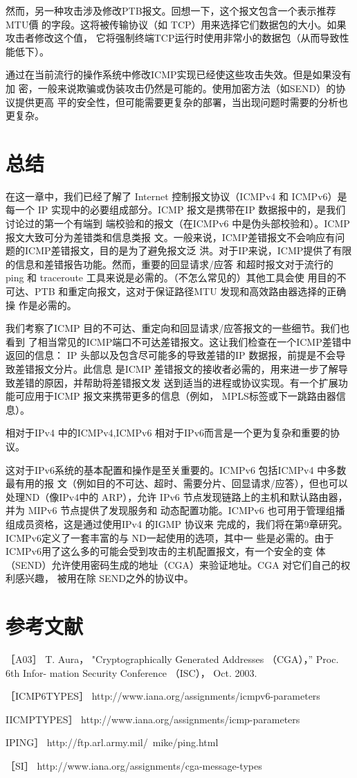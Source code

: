 然而，另一种攻击涉及修改PTB报文。回想一下，这个报文包含一个表示推荐MTU價
的字段。这将被传输协议（如 TCP）用来选择它们数据包的大小。如果攻击者修改这个值，
它将强制终端TCP运行时使用非常小的数据包（从而导致性能低下）。

通过在当前流行的操作系统中修改ICMP实现已经使这些攻击失效。但是如果没有加
密，一般来说欺骗或伪装攻击仍然是可能的。使用加密方法（如SEND）的协议提供更高
平的安全性，但可能需要更复杂的部署，当出现问题时需要的分析也更复杂。

\section{总结}

在这一章中，我们已经了解了 Internet 控制报文协议（ICMPv4 和 ICMPv6）是每一个 IP
实现中的必要组成部分。ICMP 报文是携带在IP 数据报中的，是我们讨论过的第一个有端到
端校验和的报文（在ICMPv6 中是伪头部校验和）。ICMP报文大致可分为差错类和信息类报
文。一般来说，ICMP差错报文不会响应有问题的ICMP差错报文，目的是为了避免报文泛
洪。对于IP来说，ICMP提供了有限的信息和差错报告功能。然而，重要的回显请求/应答
和超时报文对于流行的 ping 和 traceroute 工具来说是必需的。（不怎么常见的）其他工具会使
用目的不可达、PTB 和重定向报文，这对于保证路径MTU 发现和高效路由器选择的正确操
作是必需的。

我们考察了ICMP 目的不可达、重定向和回显请求/应答报文的一些细节。我们也看到
了相当常见的ICMP端口不可达差错报文。这让我们检查在一个ICMP差错中返回的信息：
IP 头部以及包含尽可能多的导致差错的IP 数据报，前提是不会导致差错报文分片。此信息
是ICMP 差错报文的接收者必需的，用来进一步了解导致差错的原因，并帮助将差错报文发
送到适当的进程或协议实现。有一个扩展功能可应用于ICMP 报文来携带更多的信息（例如，
MPLS标签或下一跳路由器信息）。

相对于IPv4 中的ICMPv4,ICMPv6 相对于IPv6而言是一个更为复杂和重要的协议。

这对于IPv6系统的基本配置和操作是至关重要的。ICMPv6 包括ICMPv4 中多数最有用的报
文（例如目的不可达、超时、需要分片、回显请求/应答），但也可以处理ND（像IPv4中的
ARP），允许 IPv6 节点发现链路上的主机和默认路由器，并为 MIPv6 节点提供了发现服务和
动态配置功能。ICMPv6 也可用于管理组播组成员资格，这是通过使用IPv4 的IGMP 协议来
完成的，我们将在第9章研究。ICMPv6定义了一套丰富的与 ND一起使用的选项，其中一
些是必需的。由于ICMPv6用了这么多的可能会受到攻击的主机配置报文，有一个安全的变
体（SEND）允许使用密码生成的地址（CGA）来验证地址。CGA 对它们自己的权利感兴趣，
被用在除 SEND之外的协议中。

\section{参考文献}
［A03］ T. Aura， "Cryptographically Generated Addresses （CGA），” Proc. 6th Infor-
mation Security Conference （ISC）， Oct. 2003.

［ICMP6TYPES］ http://www.iana.org/assignments/icmpv6-parameters

IICMPTYPES］ http://www.iana.org/assignments/icmp-parameters

IPING］ http://ftp.arl.army.mil/~mike/ping.html

［SI］ http://www.iana.org/assignments/cga-message-types
